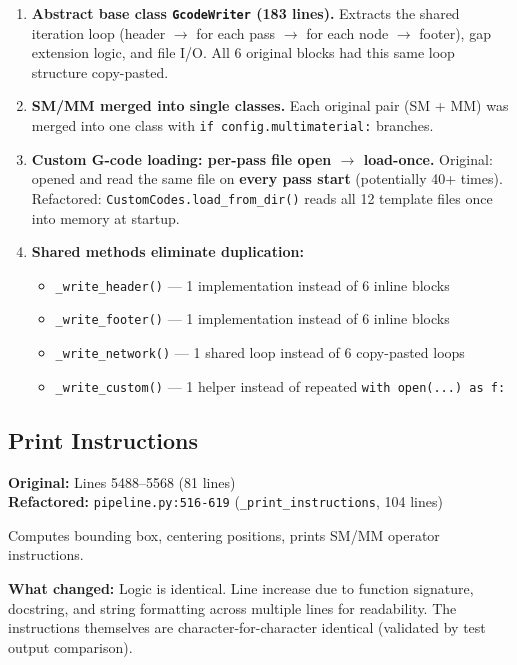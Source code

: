 \documentclass[11pt,letterpaper]{article}
\newcommand{\code}[1]{\texttt{#1}}
\begin{document}
\begin{enumerate}
    \item \textbf{Abstract base class \code{GcodeWriter} (183 lines).} Extracts the shared iteration loop (header $\to$ for each pass $\to$ for each node $\to$ footer), gap extension logic, and file I/O. All 6 original blocks had this same loop structure copy-pasted.

    \item \textbf{SM/MM merged into single classes.} Each original pair (SM + MM) was merged into one class with \code{if config.multimaterial:} branches.

    \item \textbf{Custom G-code loading: per-pass file open $\to$ load-once.} Original: opened and read the same file on \textbf{every pass start} (potentially 40+ times). Refactored: \code{CustomCodes.load\_from\_dir()} reads all 12 template files once into memory at startup.

    \item \textbf{Shared methods eliminate duplication:}
    \begin{itemize}
        \item \code{\_write\_header()} --- 1 implementation instead of 6 inline blocks
        \item \code{\_write\_footer()} --- 1 implementation instead of 6 inline blocks
        \item \code{\_write\_network()} --- 1 shared loop instead of 6 copy-pasted loops
        \item \code{\_write\_custom()} --- 1 helper instead of repeated \code{with open(...) as f:}
    \end{itemize}
\end{enumerate}

\subsection{Print Instructions}

\textbf{Original:} Lines 5488--5568 (81 lines)\\
\textbf{Refactored:} \code{pipeline.py:516-619} (\code{\_print\_instructions}, 104 lines)

Computes bounding box, centering positions, prints SM/MM operator instructions.

\textbf{What changed:} Logic is identical. Line increase due to function signature, docstring, and string formatting across multiple lines for readability. The instructions themselves are character-for-character identical (validated by test output comparison).
\end{document}
